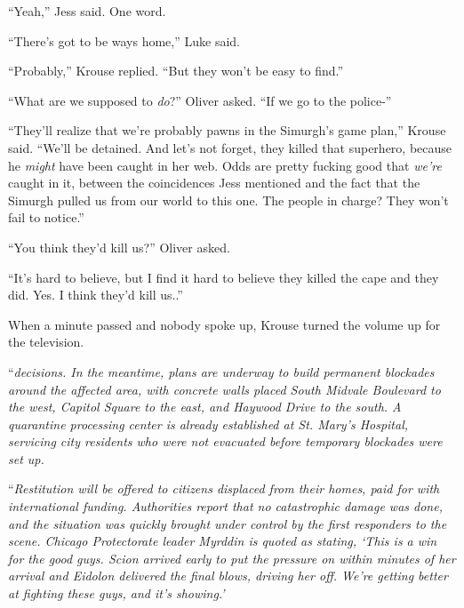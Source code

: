 ``Yeah,'' Jess said.  One word.



``There's got to be ways home,'' Luke said.



``Probably,'' Krouse replied.  ``But they won't be easy to find.''



``What are we supposed to \emph{do}?'' Oliver asked.  ``If we go to the police-''



``They'll realize that we're probably pawns in the Simurgh's game plan,'' Krouse said.  ``We'll be detained.  And let's not forget, they killed that superhero, because he \emph{might} have been caught in her web.  Odds are pretty fucking good that \emph{we're} caught in it, between the coincidences Jess mentioned and the fact that the Simurgh pulled us from our world to this one.  The people in charge?  They won't fail to notice.''



``You think they'd kill us?'' Oliver asked.



``It's hard to believe, but I find it hard to believe they killed the cape and they did.  Yes.  I think they'd kill us..''



When a minute passed and nobody spoke up, Krouse turned the volume up for the television.



``\emph{\ldotsfinal decisions.  In the meantime, plans are underway to build permanent blockades around the affected area, with concrete walls placed South Midvale Boulevard to the west, Capitol Square to the east, and Haywood Drive to the south.  A quarantine processing center is already established at St. Mary's Hospital, servicing city residents who were not evacuated before temporary blockades were set up.}



``\emph{Restitution will be offered to citizens displaced from their homes, paid for with international funding.  Authorities report that no catastrophic damage was done, and the situation was quickly brought under control by the first responders to the scene.  Chicago Protectorate leader Myrddin is quoted as stating, `This is a win for the good guys.  Scion arrived early to put the pressure on within minutes of her arrival and Eidolon delivered the final blows, driving her off.  We're getting better at fighting these guys, and it's showing.'}



